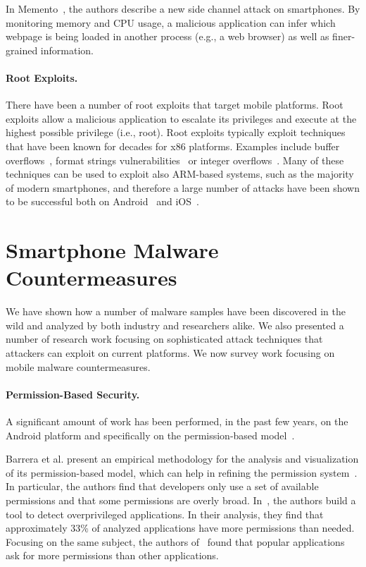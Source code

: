 In Memento~\cite{memento12}, the authors describe a new side channel attack on smartphones. By monitoring memory and CPU usage, a malicious application can infer which webpage is being loaded in another process (e.g., a web browser) as well as finer-grained information.

\paragraph{Root Exploits.}
There have been a number of root exploits that target mobile platforms. Root exploits allow a malicious application to escalate its privileges and execute at the highest possible privilege (i.e., root). Root exploits typically exploit techniques that have been known for decades for x86 platforms. Examples include buffer overflows~\cite{stackprofit}, format strings vulnerabilities~\cite{stringformat} or integer overflows~\cite{integeroverflow}. Many of these techniques can be used to exploit also ARM-based systems, such as the majority of modern smartphones, and therefore a large number of attacks have been shown to be successful both on Android~\cite{androidexploit15,androidexploit15ipc} and iOS~\cite{iosmemory13,iosmemory15}.

\section{Smartphone Malware Countermeasures}

We have shown how a number of malware samples have been discovered in the wild and analyzed by both industry and researchers alike. We also presented a number of research work focusing on sophisticated attack techniques that attackers can exploit on current platforms. We now survey work focusing on mobile malware countermeasures.

\paragraph{Permission-Based Security.}
A significant amount of work has been performed, in the past few years, on the Android platform and specifically on the permission-based model~\cite{barrera:android,androidsurgery,DBLP:conf/pldi/Chaudhuri09,DD2SW010,Android_malware_Oberhide,App_centric_android_security,Smobile_android_market_Analysis}. 

Barrera et al. present an empirical methodology for the analysis and visualization of its permission-based model, which can help in refining the permission system~\cite{barrera:android}. In particular, the authors find that developers only use a set of available permissions and that some permissions are overly broad. In~\cite{Felt2011}, the authors build a tool to detect overprivileged applications. In their analysis, they find that approximately 33\% of analyzed applications have more permissions than needed. Focusing on the same subject, the authors of~\cite{Chia2012} found that popular applications ask for more permissions than other applications.

